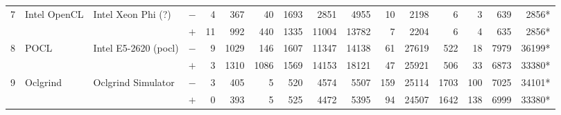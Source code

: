 \begin{tabular}{llll | rrrrrr | rrrrrr }
\hline
\multirow{ 2}{*}{7} & \multirow{ 2}{*}{Intel OpenCL} & \multirow{ 2}{*}{Intel Xeon Phi (?)} & $-$ & 4 & 367 & 40 & 1693 & 2851 & 4955       & 10 & 2198 & 6 & 3 & 639 & 2856* \\& & & $+$ & 11 & 992 & 440 & 1335 & 11004 & 13782 & 7 & 2204 & 6 & 4 & 635 & 2856* \\
\hline
\multirow{ 2}{*}{8} & \multirow{ 2}{*}{POCL} & \multirow{ 2}{*}{Intel E5-2620 (pocl)} & $-$ & 9 & 1029 & 146 & 1607 & 11347 & 14138       & 61 & 27619 & 522 & 18 & 7979 & 36199* \\& & & $+$ & 3 & 1310 & 1086 & 1569 & 14153 & 18121 & 47 & 25921 & 506 & 33 & 6873 & 33380* \\
\hline
\multirow{ 2}{*}{9} & \multirow{ 2}{*}{Oclgrind} & \multirow{ 2}{*}{Oclgrind Simulator} & $-$ & 3 & 405 & 5 & 520 & 4574 & 5507       & 159 & 25114 & 1703 & 100 & 7025 & 34101* \\& & & $+$ & 0 & 393 & 5 & 525 & 4472 & 5395 & 94 & 24507 & 1642 & 138 & 6999 & 33380* \\
  \bottomrule
\end{tabular}

